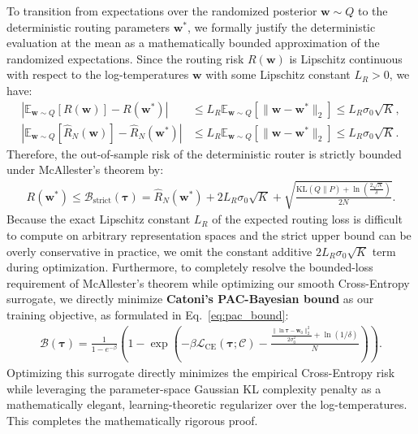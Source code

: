 \documentclass{article}
\theoremstyle{plain}
\theoremstyle{definition}
\theoremstyle{remark}
\begin{document}
To transition from expectations over the randomized posterior $\mathbf{w} \sim Q$ to the deterministic routing parameters $\mathbf{w}^*$, we formally justify the deterministic evaluation at the mean as a mathematically bounded approximation of the randomized expectations. Since the routing risk $R(\mathbf{w})$ is Lipschitz continuous with respect to the log-temperatures $\mathbf{w}$ with some Lipschitz constant $L_R > 0$, we have:
\begin{align}
    \left| \mathbb{E}_{\mathbf{w} \sim Q} [ R(\mathbf{w}) ] - R(\mathbf{w}^*) \right| &\le L_R \mathbb{E}_{\mathbf{w} \sim Q} \left[ \|\mathbf{w} - \mathbf{w}^*\|_2 \right] \le L_R \sigma_0 \sqrt{K}, \\
    \left| \mathbb{E}_{\mathbf{w} \sim Q} [ \hat{R}_N(\mathbf{w}) ] - \hat{R}_N(\mathbf{w}^*) \right| &\le L_R \mathbb{E}_{\mathbf{w} \sim Q} \left[ \|\mathbf{w} - \mathbf{w}^*\|_2 \right] \le L_R \sigma_0 \sqrt{K}.
\end{align}
Therefore, the out-of-sample risk of the deterministic router is strictly bounded under McAllester's theorem by:
\begin{align}
    R(\mathbf{w}^*) \le \mathcal{B}_{\text{strict}}(\boldsymbol{\tau}) = \hat{R}_N(\mathbf{w}^*) + 2 L_R \sigma_0 \sqrt{K} + \sqrt{\frac{\text{KL}(Q \| P) + \ln\left(\frac{2\sqrt{N}}{\delta}\right)}{2N}}.
\end{align}
Because the exact Lipschitz constant $L_R$ of the expected routing loss is difficult to compute on arbitrary representation spaces and the strict upper bound can be overly conservative in practice, we omit the constant additive $2 L_R \sigma_0 \sqrt{K}$ term during optimization. Furthermore, to completely resolve the bounded-loss requirement of McAllester's theorem while optimizing our smooth Cross-Entropy surrogate, we directly minimize \textbf{Catoni's PAC-Bayesian bound} as our training objective, as formulated in Eq.~\ref{eq:pac_bound}:
\begin{align}
    \mathcal{B}(\boldsymbol{\tau}) = \frac{1}{1 - e^{-\beta}} \left( 1 - \exp\left( -\beta \mathcal{L}_{\text{CE}}(\boldsymbol{\tau}; \mathcal{C}) - \frac{\frac{\|\ln \boldsymbol{\tau} - \mathbf{w}_0\|_2^2}{2 \sigma_0^2} + \ln(1/\delta)}{N} \right) \right).
\end{align}
Optimizing this surrogate directly minimizes the empirical Cross-Entropy risk while leveraging the parameter-space Gaussian KL complexity penalty as a mathematically elegant, learning-theoretic regularizer over the log-temperatures.
This completes the mathematically rigorous proof.
\end{document}
